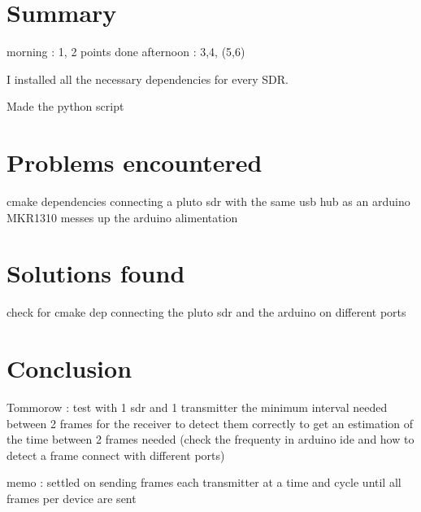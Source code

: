 \documentclass[a4paper, 12pt]{article}
\begin{document}
\section{Summary}
morning : 1, 2 points done 
afternoon : 3,4, (5,6)

I installed all the necessary dependencies for every SDR.

Made the python script 

\section{Problems encountered} 
cmake dependencies
connecting a pluto sdr with the same usb hub as an arduino MKR1310 messes up the arduino alimentation

\section{Solutions found}
check for cmake dep
connecting the pluto sdr and the arduino on different ports

\section{Conclusion}
Tommorow : test with 1 sdr and 1 transmitter the minimum interval needed between 2 frames for the receiver to detect them correctly
to get an estimation of the time between 2 frames needed
(check the frequenty in arduino ide and how to detect a frame connect with different ports)

memo : settled on sending frames each transmitter at a time and cycle until all frames per device are sent
\end{document}
